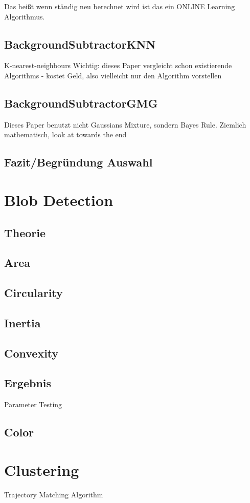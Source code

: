Das heißt wenn ständig neu berechnet wird ist das ein ONLINE Learning Algorithmus.
\cite{Bowden}
\subsection{BackgroundSubtractorKNN}
K-nearest-neighbours
Wichtig: dieses Paper vergleicht schon existierende Algorithms
- kostet Geld, also vielleicht nur den Algorithm vorstellen
\cite{ZIVKOVIC2006773}
\subsection{BackgroundSubtractorGMG}
Dieses Paper benutzt nicht Gaussians Mixture, sondern Bayes Rule. Ziemlich mathematisch, look at towards the end
\cite{6315174}
\subsection{Fazit/Begründung Auswahl}
\section{Blob Detection}
\subsection{Theorie}
\subsection{Area}
\subsection{Circularity}
\subsection{Inertia}
\subsection{Convexity}
\subsection{Ergebnis}
Parameter Testing
\subsection{Color}
\section{Clustering}
Trajectory Matching Algorithm
